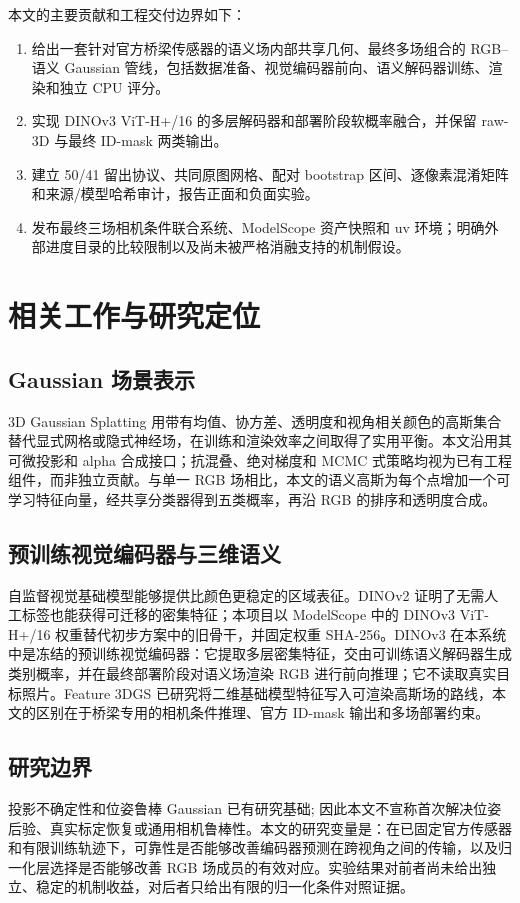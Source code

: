 \documentclass[UTF8,a4paper,11pt]{ctexart}
\newcommand{\GS}{3D Gaussian Splatting}
\begin{document}
本文的主要贡献和工程交付边界如下：
\begin{enumerate}
  \item 给出一套针对官方桥梁传感器的语义场内部共享几何、最终多场组合的 RGB--语义 Gaussian 管线，包括数据准备、视觉编码器前向、语义解码器训练、渲染和独立 CPU 评分。
  \item 实现 DINOv3 ViT-H+/16 的多层解码器和部署阶段软概率融合，并保留 raw-3D 与最终 ID-mask 两类输出。
  \item 建立 50/41 留出协议、共同原图网格、配对 bootstrap 区间、逐像素混淆矩阵和来源/模型哈希审计，报告正面和负面实验。
  \item 发布最终三场相机条件联合系统、ModelScope 资产快照和 uv 环境；明确外部进度目录的比较限制以及尚未被严格消融支持的机制假设。
\end{enumerate}

\section{相关工作与研究定位}
\subsection{Gaussian 场景表示}
\GS{} 用带有均值、协方差、透明度和视角相关颜色的高斯集合替代显式网格或隐式神经场，在训练和渲染效率之间取得了实用平衡\cite{kerbl2023gaussian}。本文沿用其可微投影和 alpha 合成接口；抗混叠、绝对梯度和 MCMC 式策略均视为已有工程组件，而非独立贡献。与单一 RGB 场相比，本文的语义高斯为每个点增加一个可学习特征向量，经共享分类器得到五类概率，再沿 RGB 的排序和透明度合成。

\subsection{预训练视觉编码器与三维语义}
自监督视觉基础模型能够提供比颜色更稳定的区域表征。DINOv2 证明了无需人工标签也能获得可迁移的密集特征\cite{ocal2023dinov2}；本项目以 ModelScope 中的 DINOv3 ViT-H+/16 权重替代初步方案中的旧骨干，并固定权重 SHA-256。DINOv3 在本系统中是冻结的预训练视觉编码器：它提取多层密集特征，交由可训练语义解码器生成类别概率，并在最终部署阶段对语义场渲染 RGB 进行前向推理；它不读取真实目标照片。Feature 3DGS 已研究将二维基础模型特征写入可渲染高斯场的路线\cite{jiang2024feature3dgs}，本文的区别在于桥梁专用的相机条件推理、官方 ID-mask 输出和多场部署约束。

\subsection{研究边界}
投影不确定性和位姿鲁棒 Gaussian 已有研究基础\cite{zhao2024robust}; 因此本文不宣称首次解决位姿后验、真实标定恢复或通用相机鲁棒性。本文的研究变量是：在已固定官方传感器和有限训练轨迹下，可靠性是否能够改善编码器预测在跨视角之间的传输，以及归一化层选择是否能够改善 RGB 场成员的有效对应。实验结果对前者尚未给出独立、稳定的机制收益，对后者只给出有限的归一化条件对照证据。
\end{document}
